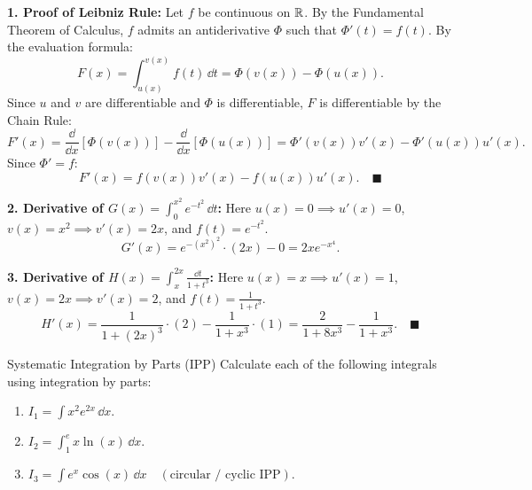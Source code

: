 \begin{tabletworkspace}[5.0cm]
\end{tabletworkspace}

\begin{solution}
\textbf{1. Proof of Leibniz Rule:}
Let $f$ be continuous on $\mathbb{R}$. By the Fundamental Theorem of Calculus, $f$ admits an antiderivative $\Phi$ such that $\Phi'(t) = f(t)$.
By the evaluation formula:
\[
F(x) = \int_{u(x)}^{v(x)} f(t)\,\dd t = \Phi(v(x)) - \Phi(u(x)).
\]
Since $u$ and $v$ are differentiable and $\Phi$ is differentiable, $F$ is differentiable by the Chain Rule:
\[
F'(x) = \frac{\dd}{\dd x}[\Phi(v(x))] - \frac{\dd}{\dd x}[\Phi(u(x))] = \Phi'(v(x)) v'(x) - \Phi'(u(x)) u'(x).
\]
Since $\Phi' = f$:
\[
F'(x) = f(v(x)) v'(x) - f(u(x)) u'(x). \quad \blacksquare
\]

\textbf{2. Derivative of $G(x) = \int_0^{x^2} e^{-t^2}\,\dd t$:}
Here $u(x) = 0 \implies u'(x) = 0$, $v(x) = x^2 \implies v'(x) = 2x$, and $f(t) = e^{-t^2}$.
\[
G'(x) = e^{-(x^2)^2} \cdot (2x) - 0 = 2x e^{-x^4}.
\]

\textbf{3. Derivative of $H(x) = \int_x^{2x} \frac{\dd t}{1 + t^3}$:}
Here $u(x) = x \implies u'(x) = 1$, $v(x) = 2x \implies v'(x) = 2$, and $f(t) = \frac{1}{1 + t^3}$.
\[
H'(x) = \frac{1}{1 + (2x)^3} \cdot (2) - \frac{1}{1 + x^3} \cdot (1) = \frac{2}{1 + 8x^3} - \frac{1}{1 + x^3}. \quad \blacksquare
\]
\end{solution}

\begin{exercise}{Systematic Integration by Parts (IPP)}
Calculate each of the following integrals using integration by parts:
\begin{enumerate}[leftmargin=1.5em,itemsep=2pt]
  \item $I_1 = \int x^2 e^{2x}\,\dd x$.
  \item $I_2 = \int_1^e x \ln(x)\,\dd x$.
  \item $I_3 = \int e^x \cos(x)\,\dd x \quad (\text{circular / cyclic IPP})$.
\end{enumerate}
\end{exercise}

\begin{tabletworkspace}[5.0cm]
\end{tabletworkspace}

